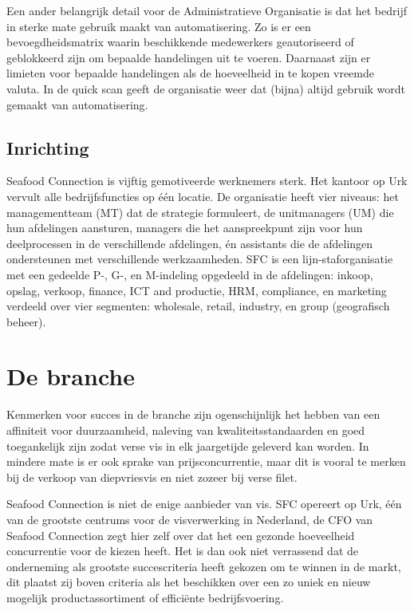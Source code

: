 \documentclass[10pt,a4paper,twoside]{report}
\begin{document}
Een ander belangrijk detail voor de Administratieve Organisatie is dat het bedrijf in sterke mate gebruik maakt van automatisering. Zo is er een bevoegdheidsmatrix waarin beschikkende medewerkers geautoriseerd of geblokkeerd zijn om bepaalde handelingen uit te voeren. Daarnaast zijn er limieten voor bepaalde handelingen als de hoeveelheid in te kopen vreemde valuta. In de quick scan geeft de organisatie weer dat (bijna) altijd gebruik wordt gemaakt van automatisering. \citep{quickscan}

\subsection{Inrichting}
Seafood Connection is vijftig gemotiveerde werknemers sterk. Het kantoor op Urk vervult alle bedrijfsfuncties op één locatie. De organisatie heeft vier niveaus: het managementteam (MT) dat de strategie formuleert, de unitmanagers (UM) die hun afdelingen aansturen, managers die het aanspreekpunt zijn voor hun deelprocessen in de verschillende afdelingen, én assistants die de afdelingen ondersteunen met verschillende werkzaamheden. SFC is een lijn-staforganisatie met een gedeelde P-, G-, en M-indeling opgedeeld in de afdelingen: inkoop, opslag, verkoop, finance, ICT and productie, HRM, compliance, en marketing verdeeld over vier segmenten: wholesale, retail, industry, en group (geografisch beheer). \citep{quickscan}

\section{De branche}
Kenmerken voor succes in de branche zijn ogenschijnlijk het hebben van een affiniteit voor duurzaamheid, naleving van kwaliteitsstandaarden en goed toegankelijk zijn zodat verse vis in elk jaargetijde geleverd kan worden. In mindere mate is er ook sprake van prijsconcurrentie, maar dit is vooral te merken bij de verkoop van diepvriesvis en niet zozeer bij verse filet. 

Seafood Connection is niet de enige aanbieder van vis. SFC opereert op Urk, één van de grootste centrums voor de visverwerking in Nederland, de CFO van Seafood Connection zegt hier zelf over dat het een gezonde hoeveelheid concurrentie voor de kiezen heeft. Het is dan ook niet verrassend dat de onderneming als grootste succescriteria heeft gekozen om te winnen in de markt, dit plaatst zij boven criteria als het beschikken over een zo uniek en nieuw mogelijk productassortiment of efficiënte bedrijfsvoering. 
\end{document}
